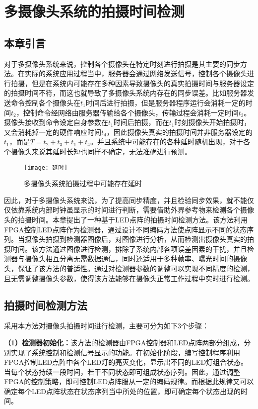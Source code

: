 \chapter{多摄像头系统的拍摄时间检测}

\section{本章引言}

对于多摄像头系统来说，控制各个摄像头在特定时刻进行拍摄是其主要的同步方法。在实际的系统应用过程当中，服务器会通过网络发送信号，控制各个摄像头进行拍摄，但是在系统内可能存在多种因素导致摄像头的真实拍摄时间与服务器设定的拍摄时间不符，而这也就导致了多摄像头系统内存在的同步误差。比如服务器发送命令控制各个摄像头在$t_1$时间后进行拍摄，但是服务器程序运行会消耗一定的时间$t_2$，控制命令经网络由服务器传输给各个摄像头，传输过程会消耗一定时间$t_3$。摄像头接收到命令设定自身参数在$t_1$时间后拍摄，而在$t_1$时刻摄像头开始拍摄时，又会消耗掉一定的硬件响应时间$t_4$，因此摄像头真实的拍摄时间并非服务器设定的$t_1$，而是$T = t_2 + t_3 + t_1 + t_4$。并且系统中可能存在的各种延时随机出现，对于各个摄像头来说其延时长短也同样不确定，无法准确进行预测。

\begin{figure}[h] 
  \centering
  \texttt{[image: 延时]}
  \caption{多摄像头系统拍摄过程中可能存在延时}
\end{figure}

因此，对于多摄像头系统来说，为了提高同步精度，并且检验同步效果，就不能仅仅依靠系统内部时钟虽显示的时间进行判断，需要借助外界参考物来检测各个摄像头的拍摄时间。本章提出了一种基于LED点阵的拍摄时间检测方法。该方法利用FPGA控制LED点阵作为检测器，通过设计不同编码方法使点阵显示不同的状态序列。当摄像头拍摄到检测器图像后，对图像进行分析，从而检测出摄像头真实的拍摄时间。该方法通过图像进行检测，排除了系统内部各项误差因素的干扰，并且检测器与摄像头相互分离无需数据通信，同时还适用于多种帧率、曝光时间的摄像头，保证了该方法的普适性。通过对检测器参数的调整可以实现不同精度的检测，且无需调整摄像头参数，使得该方法能够在摄像头正常工作过程中实时进行检测。

\section{拍摄时间检测方法}

采用本方法对摄像头拍摄时间进行检测，主要可分为如下3个步骤：

\textbf{（1）检测器初始化：}该方法的检测器由FPGA控制器和LED点阵两部分组成，分别实现了系统控制和检测信号显示的功能。在初始化阶段，编写控制程序利用FPGA控制LED点阵中各个LED灯的亮灭变化，显示出不同的LED灯组合状态。当每个状态持续一段时间，若干不同状态即可组成状态序列。因此，通过调整FPGA的控制策略，即可控制LED点阵服从一定的编码规律。而根据此规律又可以确定每个LED点阵状态在状态序列当中所处的位置，即可确定每个状态出现的时间。

